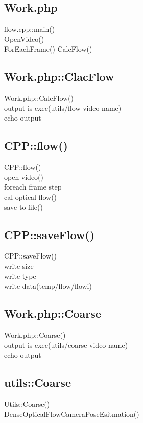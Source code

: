 \documentclass{article}
\begin{document}
\subsection{Work.php}
flow.cpp::main()\\
\indent OpenVideo()\\
\indent ForEachFrame()
\indent CalcFlow()

\subsection{Work.php::ClacFlow}
Work.php::CalcFlow()\\
\indent output is exec(utils/flow video name)\\
\indent echo output



\subsection{CPP::flow()}
CPP::flow()\\
\indent open video()\\
\indent foreach frame step\\
\indent \indent cal optical flow()\\
\indent \indent save to file()

\subsection{CPP::saveFlow()}
CPP::saveFlow()\\
\indent write size\\
\indent write type\\
\indent write data(temp/flow/flowi)

\subsection{Work.php::Coarse}
Work.php::Coarse()\\
\indent output is exec(utils/coarse video name)\\
\indent echo output

\subsection{utils::Coarse}
Utils::Coarse()\\
\indent DenseOpticalFlowCameraPoseEsitmation()


\iffalse
\fi
\end{document}
